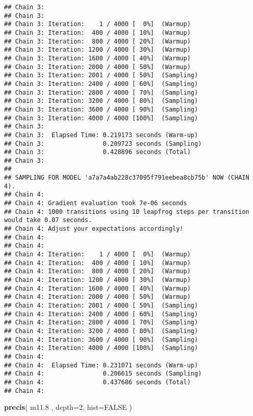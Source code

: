 \documentclass[]{article}
\newenvironment{Shaded}{\begin{snugshade}}{\end{snugshade}}
\newcommand{\KeywordTok}[1]{\textcolor[rgb]{0.13,0.29,0.53}{\textbf{{#1}}}}
\newcommand{\DataTypeTok}[1]{\textcolor[rgb]{0.13,0.29,0.53}{{#1}}}
\newcommand{\DecValTok}[1]{\textcolor[rgb]{0.00,0.00,0.81}{{#1}}}
\newcommand{\FloatTok}[1]{\textcolor[rgb]{0.00,0.00,0.81}{{#1}}}
\newcommand{\OtherTok}[1]{\textcolor[rgb]{0.56,0.35,0.01}{{#1}}}
\newcommand{\NormalTok}[1]{{#1}}
\begin{document}
\begin{verbatim}
## Chain 3: 
## Chain 3: 
## Chain 3: Iteration:    1 / 4000 [  0%]  (Warmup)
## Chain 3: Iteration:  400 / 4000 [ 10%]  (Warmup)
## Chain 3: Iteration:  800 / 4000 [ 20%]  (Warmup)
## Chain 3: Iteration: 1200 / 4000 [ 30%]  (Warmup)
## Chain 3: Iteration: 1600 / 4000 [ 40%]  (Warmup)
## Chain 3: Iteration: 2000 / 4000 [ 50%]  (Warmup)
## Chain 3: Iteration: 2001 / 4000 [ 50%]  (Sampling)
## Chain 3: Iteration: 2400 / 4000 [ 60%]  (Sampling)
## Chain 3: Iteration: 2800 / 4000 [ 70%]  (Sampling)
## Chain 3: Iteration: 3200 / 4000 [ 80%]  (Sampling)
## Chain 3: Iteration: 3600 / 4000 [ 90%]  (Sampling)
## Chain 3: Iteration: 4000 / 4000 [100%]  (Sampling)
## Chain 3: 
## Chain 3:  Elapsed Time: 0.219173 seconds (Warm-up)
## Chain 3:                0.209723 seconds (Sampling)
## Chain 3:                0.428896 seconds (Total)
## Chain 3: 
## 
## SAMPLING FOR MODEL 'a7a7a4ab228c37095f791eebea8cb75b' NOW (CHAIN 4).
## Chain 4: 
## Chain 4: Gradient evaluation took 7e-06 seconds
## Chain 4: 1000 transitions using 10 leapfrog steps per transition would take 0.07 seconds.
## Chain 4: Adjust your expectations accordingly!
## Chain 4: 
## Chain 4: 
## Chain 4: Iteration:    1 / 4000 [  0%]  (Warmup)
## Chain 4: Iteration:  400 / 4000 [ 10%]  (Warmup)
## Chain 4: Iteration:  800 / 4000 [ 20%]  (Warmup)
## Chain 4: Iteration: 1200 / 4000 [ 30%]  (Warmup)
## Chain 4: Iteration: 1600 / 4000 [ 40%]  (Warmup)
## Chain 4: Iteration: 2000 / 4000 [ 50%]  (Warmup)
## Chain 4: Iteration: 2001 / 4000 [ 50%]  (Sampling)
## Chain 4: Iteration: 2400 / 4000 [ 60%]  (Sampling)
## Chain 4: Iteration: 2800 / 4000 [ 70%]  (Sampling)
## Chain 4: Iteration: 3200 / 4000 [ 80%]  (Sampling)
## Chain 4: Iteration: 3600 / 4000 [ 90%]  (Sampling)
## Chain 4: Iteration: 4000 / 4000 [100%]  (Sampling)
## Chain 4: 
## Chain 4:  Elapsed Time: 0.231071 seconds (Warm-up)
## Chain 4:                0.206615 seconds (Sampling)
## Chain 4:                0.437686 seconds (Total)
## Chain 4:
\end{verbatim}

\begin{Shaded}
\begin{Highlighting}[]
\KeywordTok{precis}\NormalTok{( m11}\FloatTok{.8} \NormalTok{, }\DataTypeTok{depth=}\DecValTok{2}\NormalTok{, }\DataTypeTok{hist=}\OtherTok{FALSE} \NormalTok{)}
\end{Highlighting}
\end{Shaded}
\end{document}
